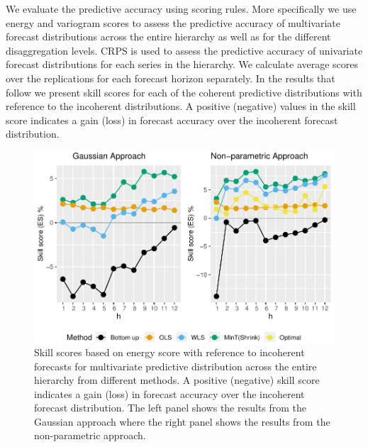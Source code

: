 \documentclass[12pt]{article}
\theoremstyle{definition}
\begin{document}
We evaluate the predictive accuracy using scoring rules. More specifically we use energy and variogram scores to assess the predictive accuracy of multivariate forecast distributions across the entire hierarchy as well as for the different disaggregation levels. CRPS is used to assess the predictive accuracy of univariate forecast distributions for each series in the hierarchy. We calculate average scores over the replications for each forecast horizon separately. In the results that follow we present skill scores for each of the coherent predictive distributions with reference to the incoherent distributions. A positive (negative) values in the skill score indicates a gain (loss) in forecast accuracy over the incoherent forecast distribution.

\begin{figure}
	\centering
	\small
	\includegraphics[width= .95\textwidth]{Empirical-results/Results-ARIMA/Overall_Summary.pdf}
	\caption{Skill scores based on energy score with reference to incoherent forecasts for multivariate predictive distribution across the entire hierarchy from different methods. A positive (negative) skill score indicates a gain (loss) in forecast accuracy over the incoherent forecast distribution. The left panel shows the results from the Gaussian approach where the right panel shows the results from the non-parametric approach.}\label{fig:EmpResults_AllTS}
\end{figure}
\end{document}
